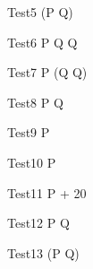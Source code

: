 \begin{circus}
   \circprocess Test5 \circdef  {} \rcirctime \circstartby (P  \circseq Q)\\
\end{circus}

\begin{circus}
   \circprocess Test6 \circdef  P \circseq Q \circseq {} \rcirctime \circstartby Q\\
\end{circus}

\begin{circus}
   \circprocess Test7 \circdef  P \circseq (Q \circseq {} \rcirctime \circstartby Q)\\
\end{circus}

\begin{circus}
   \circprocess Test8 \circdef  {} \rcirctime \circstartby P \circseq {} \rcirctime \circstartby Q\\
\end{circus}



\begin{circus}
   \circprocess Test9 \circdef  P \circendby {} \rcirctime   \\
\end{circus}


\begin{circus}
   \circprocess Test10 \circdef  P \circendby {}  \rcirctime  \\
\end{circus}

\begin{circus}
   \circprocess Test11 \circdef  P \circendby {} + 20 \rcirctime   \\
\end{circus}


\begin{circus}
   \circprocess Test12 \circdef  P \circseq Q \circendby {} \rcirctime  \\
\end{circus}

\begin{circus}
   \circprocess Test13 \circdef  (P \circseq Q) \circendby {} \rcirctime \\
\end{circus}

